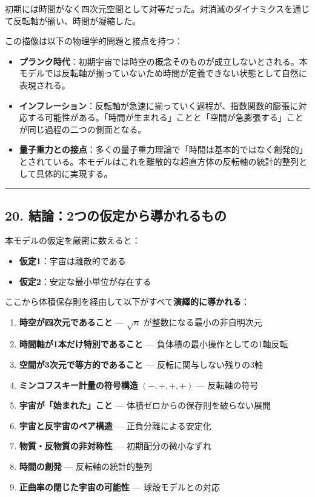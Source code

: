 \documentclass[a4paper,11pt]{ltjsarticle}
\theoremstyle{definition}
\providecommand{\tightlist}{\setlength{\itemsep}{0pt}\setlength{\parskip}{0pt}}
\begin{document}
初期には時間がなく四次元空間として対等だった。対消滅のダイナミクスを通じて反転軸が揃い、時間が凝縮した。

この描像は以下の物理学的問題と接点を持つ：

\begin{itemize}
\tightlist
\item
  \textbf{プランク時代}：初期宇宙では時空の概念そのものが成立しないとされる。本モデルでは反転軸が揃っていないため時間が定義できない状態として自然に表現される。
\item
  \textbf{インフレーション}：反転軸が急速に揃っていく過程が、指数関数的膨張に対応する可能性がある。「時間が生まれる」ことと「空間が急膨張する」ことが同じ過程の二つの側面となる。
\item
  \textbf{量子重力との接点}：多くの量子重力理論で「時間は基本的ではなく創発的」とされている。本モデルはこれを離散的な超直方体の反転軸の統計的整列として具体的に実現する。
\end{itemize}

\begin{center}\rule{0.5\linewidth}{0.5pt}\end{center}

\subsection{20.
結論：2つの仮定から導かれるもの}\label{ux7d50ux8ad62ux3064ux306eux4eeeux5b9aux304bux3089ux5c0eux304bux308cux308bux3082ux306e}

本モデルの仮定を厳密に数えると：

\begin{itemize}
\tightlist
\item
  \textbf{仮定1}：宇宙は離散的である
\item
  \textbf{仮定2}：安定な最小単位が存在する
\end{itemize}

ここから体積保存則を経由して以下がすべて\textbf{演繹的に導かれる}：

\begin{enumerate}
\def\labelenumi{\arabic{enumi}.}
\tightlist
\item
  \textbf{時空が四次元であること} --- \(\sqrt{n}\)
  が整数になる最小の非自明次元
\item
  \textbf{時間軸が1本だけ特別であること} ---
  負体積の最小操作としての1軸反転
\item
  \textbf{空間が3次元で等方的であること} --- 反転に関与しない残りの3軸
\item
  \textbf{ミンコフスキー計量の符号構造} \((-,+,+,+)\) --- 反転軸の符号
\item
  \textbf{宇宙が「始まれた」こと} --- 体積ゼロからの保存則を破らない展開
\item
  \textbf{宇宙と反宇宙のペア構造} --- 正負分離による安定化
\item
  \textbf{物質・反物質の非対称性} --- 初期配分の微小なずれ
\item
  \textbf{時間の創発} --- 反転軸の統計的整列
\item
  \textbf{正曲率の閉じた宇宙の可能性} --- 球殻モデルとの対応
\end{enumerate}
\end{document}
